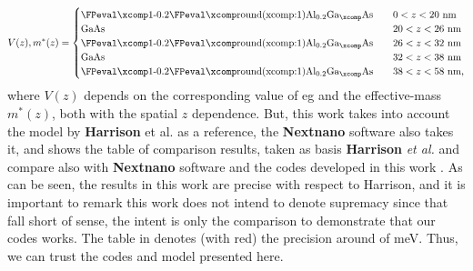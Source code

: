 \begin{equation}\label{eqn:chapter-2-sec-numerical-calculations-harrison-potential-profile}
	V(z),m^{*}(z)=\begin{cases}
		\text{\algaasx{0.2}}\quad &0<z<20\text{ nm}\\
		\text{GaAs}\quad    &20<z<26\text{ nm}\\
		\text{\algaasx{0.2}}\quad &26<z<32\text{ nm}\\
		\text{GaAs}\quad    &32<z<38\text{ nm}\\
		\text{\algaasx{0.2}}\quad &38<z<58\text{ nm},
	\end{cases}
\end{equation}
where  $V(z)$ depends on  the corresponding value of \gls{eg} and the effective-mass $m^{*}(z)$, both with the spatial $z$ dependence. But, this work takes into account the model by \textbf{Harrison} et al.\cite{harrison2016quantum} as a reference, the \textbf{Nextnano} software\cite{birner2007Nextnano,Nextnanoharrison} also takes it,  and  shows the table of comparison results, taken as basis \textbf{Harrison} \textit{et al.} and compare also with  \textbf{Nextnano} software and the codes developed in this work \cite{cqws-codes}. As can be seen, the results in this work are precise with respect to Harrison, and it is important to remark this work does not intend to denote supremacy since that fall short of sense, the intent is only the comparison to demonstrate that our codes works. The table in  denotes (with red) the precision around of meV. Thus, we can trust the codes and model presented here. 
